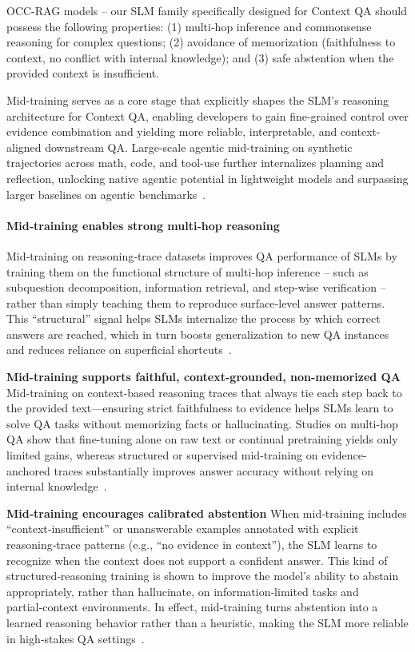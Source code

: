 OCC-RAG models -- our SLM family specifically designed for Context QA should possess the following properties: (1) multi‑hop inference and commonsense reasoning for complex questions; (2) avoidance of memorization (faithfulness to context, no conflict with internal knowledge); and (3) safe abstention when the provided context is insufficient.

Mid-training serves as a core stage that explicitly shapes the SLM's reasoning architecture for Context QA, enabling developers to gain fine-grained control over evidence combination and yielding more reliable, interpretable, and context-aligned downstream QA. Large-scale agentic mid-training on synthetic trajectories across math, code, and tool-use further internalizes planning and reflection, unlocking native agentic potential in lightweight models and surpassing larger baselines on agentic benchmarks~\citep{pleias,youtu}.

\paragraph{Mid‑training enables strong multi‑hop reasoning} 
Mid‑training on reasoning‑trace datasets improves QA performance of SLMs by training them on the functional structure of multi‑hop inference -- such as subquestion decomposition, information retrieval, and step‑wise verification -- rather than simply teaching them to reproduce surface‑level answer patterns. This ``structural'' signal helps SLMs internalize the process by which correct answers are reached, which in turn boosts generalization to new QA instances and reduces reliance on superficial shortcuts~\citep{lee-hockenmaier-2025-evaluating,liang2026longdocument}.

\textbf{Mid-training supports faithful, context-grounded, non-memorized QA} Mid-training on context-based reasoning traces that always tie each step back to the provided text—ensuring strict faithfulness to evidence helps SLMs learn to solve QA tasks without memorizing facts or hallucinating. Studies on multi-hop QA show that fine-tuning alone on raw text or continual pretraining yields only limited gains, whereas structured or supervised mid-training on evidence-anchored traces substantially improves answer accuracy without relying on internal knowledge~\citep{ren2026sinbenchtracingnativeevidence,li-etal-2024-teaching}.

\textbf{Mid‑training encourages calibrated abstention} When mid‑training includes ``context‑insufficient'' or unanswerable examples annotated with explicit reasoning‑trace patterns (e.g., ``no evidence in context''), the SLM learns to recognize when the context does not support a confident answer. This kind of structured‑reasoning training is shown to improve the model’s ability to abstain appropriately, rather than hallucinate, on information‑limited tasks and partial‑context environments. In effect, mid‑training turns abstention into a learned reasoning behavior rather than a heuristic, making the SLM more reliable in high‑stakes QA settings~\citep{zhou2026when,wen-etal-2024-characterizing}.